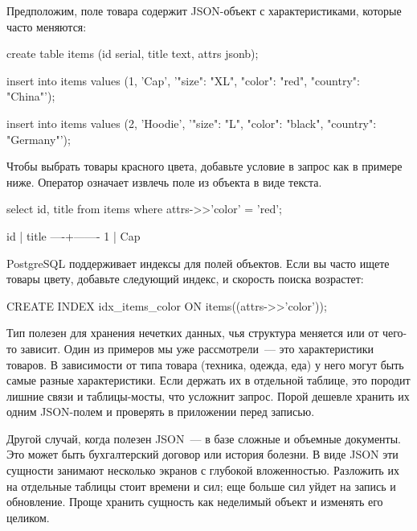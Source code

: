 Предположим, поле  товара содержит JSON-объект с характеристиками, которые часто меняются:

\begin{english}
  \begin{sql}
create table items (id serial, title text, attrs jsonb);

insert into items values
  (1, 'Cap', '{"size": "XL", "color": "red", "country": "China"}');

insert into items values
  (2, 'Hoodie', '{"size": "L", "color": "black", "country": "Germany"}');
  \end{sql}
\end{english}

Чтобы выбрать товары красного цвета, добавьте условие в запрос как в примере ниже. Оператор \code{->>} означает извлечь поле  из объекта в виде текста.

\begin{english}
  \begin{sql}
select id, title from items where attrs->>'color' = 'red';

 id | title
----+-------
  1 | Cap
  \end{sql}
\end{english}

PostgreSQL поддерживает индексы для полей объектов. Если вы часто ищете товары цвету, добавьте следующий индекс, и скорость поиска возрастет:

\begin{english}
  \begin{clojure}
CREATE INDEX idx_items_color ON items((attrs->>'color'));
  \end{clojure}
\end{english}

Тип  полезен для хранения нечетких данных, чья структура меняется или от чего-то зависит. Один из примеров мы уже рассмотрели~--- это характеристики товаров. В зависимости от типа товара (техника, одежда, еда) у него могут быть самые разные характеристики. Если держать их в отдельной таблице, это породит лишние связи и таблицы-мосты, что усложнит запрос. Порой дешевле хранить их одним JSON-полем и проверять в приложении перед записью.

Другой случай, когда полезен JSON~--- в базе сложные и объемные документы. Это может быть бухгалтерский договор или история болезни. В виде JSON эти сущности занимают несколько экранов с глубокой вложенностью. Разложить их на отдельные таблицы стоит времени и сил; еще больше сил уйдет на запись и обновление. Проще хранить сущность как неделимый объект и изменять его целиком.


